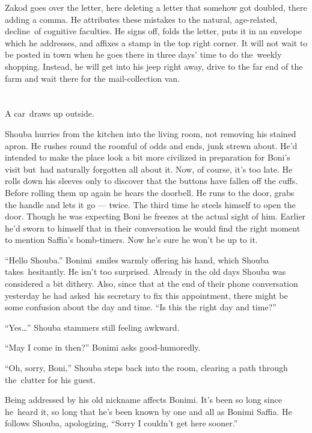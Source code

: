 \documentclass[twoside,11pt]{book}
\begin{document}
Zakod goes over the letter, here deleting a letter that somehow got doubled, there adding a comma. He attributes these
mistakes to the natural, age-related, decline~of cognitive faculties.  He signs off, folds the letter, puts it in an
envelope which he addresses, and affixes a stamp in the top right corner. It will not wait to be posted in town when he
goes there in three days{'} time to do the~weekly shopping. Instead, he will get into his jeep right away, drive to the
far end of the farm and wait there for the mail-collection van.


\chapter{}

A car~draws up outside.{ }

Shouba hurries from the kitchen into the living room, not removing his stained apron. He rushes round the roomful of
odds and ends, junk strewn about. He'd intended to make the place look a bit more civilized in preparation for Boni's
visit but~had naturally forgotten all about it. Now, of course, it's too late. He rolls down his sleeves only to
discover that the buttons have fallen off the cuffs. Before rolling them up again he hears the doorbell. He runs to the
door, grabs the handle and lets it go --- twice. The third time he steels himself to open the door. Though he was
expecting Boni he freezes at the actual sight of him. Earlier he'd sworn to himself that in their conversation he
would find the right moment to mention Saffia's bomb-timers. Now he's sure he won't be up to it.

``Hello Shouba.'' Bonimi~smiles warmly offering his hand, which Shouba takes~hesitantly. He
isn't too surprised. Already in the old days Shouba was considered a bit dithery.  Also, since that at the end of
their phone conversation yesterday he had asked~his secretary to fix this appointment, there might be some confusion
about the day and time. ``Is this the right day and time?''

``Yes{\ldots}'' Shouba stammers still feeling awkward.

``May I come in then?'' Bonimi asks good-humoredly.

``Oh, sorry, Boni,'' Shouba steps back into the room, clearing a path through the~clutter for
his guest.

Being addressed by his old nickname affects Bonimi. It's been so long since he~heard it, so long that he's been known
by{ }one and all as Bonimi Saffia. He follows Shouba, apologizing, ``Sorry I
couldn't get here sooner.''
\end{document}
